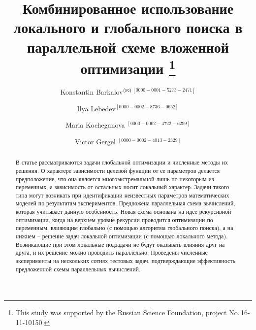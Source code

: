 \documentclass{svproc}
\def\orcidID#1{\unskip$^{[#1]}$}
\def\letter{$^{\textrm{(\Letter)}}$}
\begin{document}
\mainmatter              %
%
\title{ Комбинированное использование локального и глобального поиска в параллельной схеме вложенной оптимизации 
\thanks{This study was supported by the Russian Science Foundation, project No.\,16-11-10150.}
}
%
%
\author{Konstantin Barkalov\letter\orcidID{0000-0001-5273-2471} \and Ilya Lebedev\orcidID{0000-0002-8736-0652} \and Maria Kocheganova \orcidID{0000-0002-4722-6299} \and Victor Gergel \orcidID{0000-0002-4013-2329}}
%
%
%
	
\maketitle              %

\begin{abstract}

В статье рассматриваются задачи глобальной оптимизации и численные методы их решения. О характере зависимости целевой функции от ее параметров делается предположение, что она является многоэкстремальной лишь по некоторым из переменных, а зависимость от остальных носит локальный характер. Задачи такого типа могут возникать при идентификации неизвестных параметров математических моделей по результатам экспериментов. Предложена параллельная схема вычислений, которая учитывает данную особенность. Новая схема основана на идее рекурсивной оптимизации, когда на верхнем уровне рекурсии проводится оптимизации по переменным, влияющим глобально (с помощью алгоритма глобального поиска), а на нижнем -- решение задач локальной оптимизации (с помощью локального метода). Возникающие при этом локальные подзадачи не будут оказывать влияния друг на друга, и их решение можно проводить параллельно. Проведены численные эксперименты на нескольких сотнях тестовых задач, подтверждающие эффективность предложенной схемы параллельных вычислений.


\end{abstract}
\end{document}
